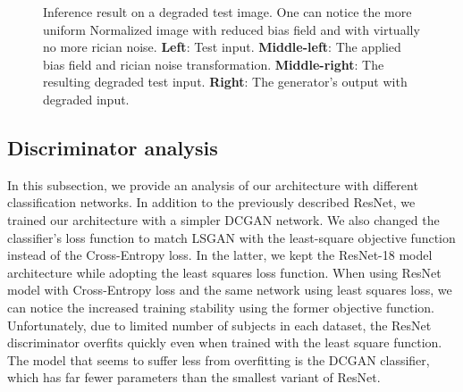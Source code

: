 \documentclass[preprint,12pt]{elsarticle}
\begin{document}
\begin{figure}
\begin{center}
    \begin{footnotesize}
    \end{footnotesize}
    \caption{Inference result on a degraded test image. One can notice the more uniform Normalized image with reduced bias field and with virtually no more rician noise. \textbf{Left}: Test input. \textbf{Middle-left}: The applied bias field and rician noise transformation. \textbf{Middle-right}: The resulting degraded test input. \textbf{Right}: The generator's output with degraded input.}
    \label{figure6}
\end{center}
\end{figure}


\subsection{Discriminator analysis}

In this subsection, we provide an analysis of our architecture with different classification networks. In addition to the previously described ResNet, we trained our architecture with a simpler DCGAN \cite{Radford2016} network. We also changed the classifier's loss function to match LSGAN \cite{Mao2017} with the least-square objective function instead of the Cross-Entropy loss. In the latter, we kept the ResNet-18 model architecture while adopting the least squares loss function. When using ResNet model with Cross-Entropy loss and the same network using least squares loss, we can notice the increased training stability using the former objective function. Unfortunately, due to limited number of subjects in each dataset, the ResNet discriminator overfits quickly even when trained with the least square function. The model that seems to suffer less from overfitting is the DCGAN classifier, which has far fewer parameters than the smallest variant of ResNet.
\end{document}
